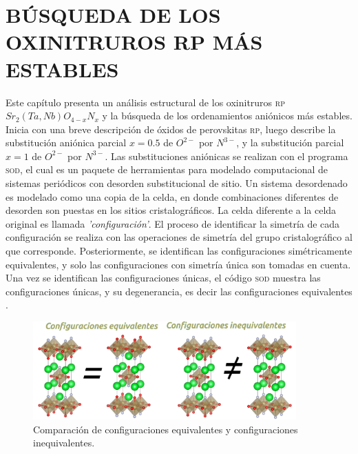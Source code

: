 \chapter{BÚSQUEDA DE LOS OXINITRUROS RP MÁS ESTABLES}\label{Cap. 2}

Este capítulo presenta un análisis estructural de los oxinitruros \textsc{rp} $Sr_{2}(Ta,Nb)O_{4-x}N_{x}$ y la búsqueda de los ordenamientos aniónicos más estables. Inicia con una breve descripción de óxidos de perovskitas \textsc{rp}, luego describe la substitución aniónica parcial $x=0.5$ de $O^{2-}$ por $N^{3-}$, y la substitución parcial $x=1$ de $O^{2-}$ por $N^{3-}$. Las substituciones aniónicas se realizan con el programa \textsc{sod}\cite{Grau-Crespo2007}, el cual es un paquete de herramientas para modelado computacional de sistemas periódicos con desorden substitucional de sitio. Un sistema desordenado es modelado como una copia de la celda, en donde combinaciones diferentes de desorden son puestas en los sitios cristalográficos. La celda diferente a la celda original es llamada \textit{'configuración'}. El proceso de identificar la simetría de cada configuración se realiza con las operaciones de simetría del grupo cristalográfico al que corresponde. Posteriormente, se identifican las configuraciones simétricamente equivalentes, y solo las configuraciones con simetría única son tomadas en cuenta. Una vez se identifican las configuraciones únicas, el código \textsc{sod} muestra las configuraciones únicas, y su degenerancia, es decir las configuraciones equivalentes \cite{Grau-Crespo2007}.


\begin{figure}[H]
    \centering
    \includegraphics[width=0.9\textwidth]{Figs/config.png}
    \caption{Comparación de configuraciones equivalentes y configuraciones inequivalentes.}
    \label{Fig. config}
\end{figure}

